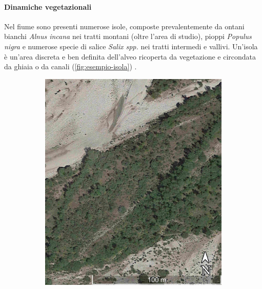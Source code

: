 \paragraph{Dinamiche vegetazionali}
Nel fiume sono presenti numerose isole, composte prevalentemente da ontani bianchi \emph{Alnus incana} nei tratti montani (oltre l'area di studio), pioppi \emph{Populus nigra} e numerose specie di salice \emph{Salix spp.} nei tratti intermedi e vallivi.
Un'isola è un'area discreta e ben definita dell'alveo ricoperta da vegetazione e circondata da ghiaia o da canali (\cref{fig:esempio-isola}) .
%
\begin{figure}
	\centering
	\begin{subfigure}[b]{0.37\textwidth}
		\includegraphics[width=\textwidth]{files/esempio_isola_sat_1.jpg}
	\end{subfigure}
	\quad
	\begin{subfigure}[b]{0.57\textwidth}

\end{subfigure}
\end{figure}
